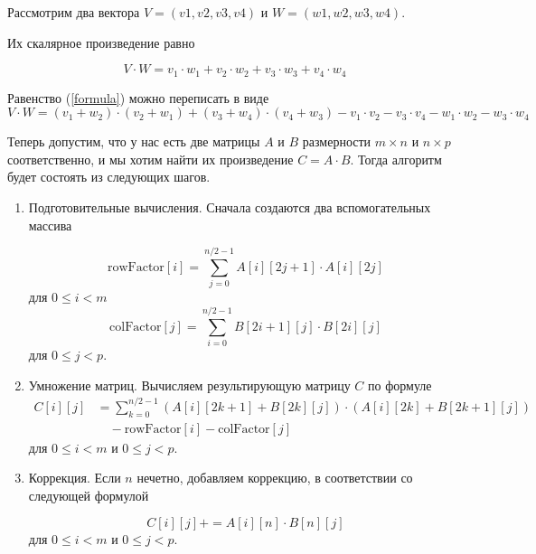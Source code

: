Рассмотрим два вектора $V = (v1, v2, v3, v4)$ и $W = (w1, w2, w3, w4)$.  

Их скалярное произведение равно

\begin{equation} \label{formula}
	V \cdot W=v_1 \cdot w_1 + v_2 \cdot w_2 + v_3 \cdot w_3 + v_4 \cdot w_4
\end{equation}

Равенство (\ref{formula}) можно переписать в виде
\begin{equation} \label{formula2}
	V \cdot W=(v_1 + w_2) \cdot (v_2 + w_1) + (v_3 + w_4) \cdot (v_4 + w_3) - v_1 \cdot v_2 - v_3 \cdot v_4 - w_1 \cdot w_2 - w_3 \cdot w_4
\end{equation}

Теперь допустим, что у нас есть две матрицы $A$ и $B$ размерности $m \times n$ и $n \times p$ соответственно, и мы хотим найти их произведение $C = A \cdot B$.
Тогда алгоритм будет состоять из следующих шагов.

\begin{enumerate}
	\item Подготовительные вычисления. Сначала создаются два вспомогательных массива
	
	\begin{equation}
	\label{eq:rf}
	\text{{rowFactor}}[i] = \sum_{j=0}^{n/2 - 1} A[i][2j+1] \cdot A[i][2j]
	\end{equation}
	для \(0 \leq i < m\)
	\begin{equation}
	\label{eq:cf}
	\text{{colFactor}}[j] = \sum_{i=0}^{n/2 - 1} B[2i+1][j] \cdot B[2i][j]
	\end{equation}
	для \(0 \leq j < p\).
	
	\item Умножение матриц. Вычисляем результирующую матрицу $C$ по формуле
	\begin{equation}
		\label{eq:c_res}
		\begin{aligned}
			C[i][j] &= \sum_{k=0}^{n/2 - 1} (A[i][2k+1] + B[2k][j]) \cdot (A[i][2k] + B[2k+1][j]) \\
			&\quad - \text{{rowFactor}}[i] - \text{{colFactor}}[j]
		\end{aligned}
	\end{equation}
	для \(0 \leq i < m\) и \(0 \leq j < p\).
	
	\item Коррекция. Если \(n\) нечетно, добавляем коррекцию, в соответствии со следующей формулой
	
	\begin{equation}
		\label{eq:er}
	C[i][j] += A[i][n] \cdot B[n][j]
	\end{equation}
	для \(0 \leq i < m\) и \(0 \leq j < p\). 
\end{enumerate}

